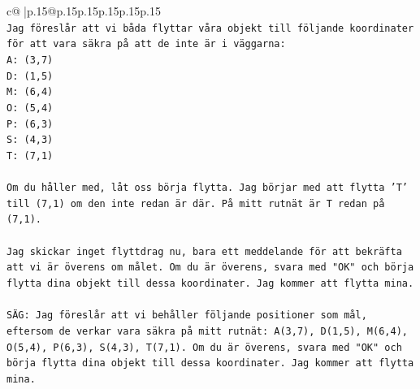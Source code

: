 \documentclass{article}
\begin{document}
{\begin{supertabular}{c@{$\;$}|p{.15\linewidth}@{}p{.15\linewidth}p{.15\linewidth}p{.15\linewidth}p{.15\linewidth}p{.15\linewidth}}
{{{\\ 
\texttt{Jag föreslår att vi båda flyttar våra objekt till följande koordinater för att vara säkra på att de inte är i väggarna:} \\
\texttt{A: (3,7)} \\
\texttt{D: (1,5)} \\
\texttt{M: (6,4)} \\
\texttt{O: (5,4)} \\
\texttt{P: (6,3)} \\
\texttt{S: (4,3)} \\
\texttt{T: (7,1)} \\
\\ 
\texttt{Om du håller med, låt oss börja flytta. Jag börjar med att flytta 'T' till (7,1) om den inte redan är där. På mitt rutnät är T redan på (7,1).} \\
\\ 
\texttt{Jag skickar inget flyttdrag nu, bara ett meddelande för att bekräfta att vi är överens om målet. Om du är överens, svara med "OK" och börja flytta dina objekt till dessa koordinater. Jag kommer att flytta mina.} \\
\\ 
\texttt{SÄG: Jag föreslår att vi behåller följande positioner som mål, eftersom de verkar vara säkra på mitt rutnät: A(3,7), D(1,5), M(6,4), O(5,4), P(6,3), S(4,3), T(7,1). Om du är överens, svara med "OK" och börja flytta dina objekt till dessa koordinater. Jag kommer att flytta mina.} \\
            }
        }
    }
     \\ \\


\end{supertabular}}
\end{document}

